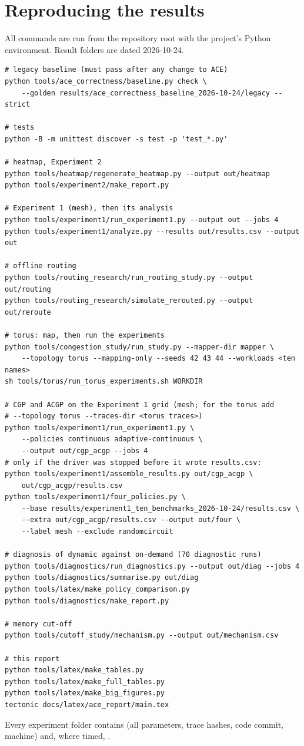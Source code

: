 \chapter{Reproducing the results}
\label{app:repro}

All commands are run from the repository root with the project's Python environment. Result folders are dated 2026-10-24.
{\small
\begin{verbatim}
# legacy baseline (must pass after any change to ACE)
python tools/ace_correctness/baseline.py check \
    --golden results/ace_correctness_baseline_2026-10-24/legacy --strict

# tests
python -B -m unittest discover -s test -p 'test_*.py'

# heatmap, Experiment 2
python tools/heatmap/regenerate_heatmap.py --output out/heatmap
python tools/experiment2/make_report.py

# Experiment 1 (mesh), then its analysis
python tools/experiment1/run_experiment1.py --output out --jobs 4
python tools/experiment1/analyze.py --results out/results.csv --output out

# offline routing
python tools/routing_research/run_routing_study.py --output out/routing
python tools/routing_research/simulate_rerouted.py --output out/reroute

# torus: map, then run the experiments
python tools/congestion_study/run_study.py --mapper-dir mapper \
    --topology torus --mapping-only --seeds 42 43 44 --workloads <ten names>
sh tools/torus/run_torus_experiments.sh WORKDIR

# CGP and ACGP on the Experiment 1 grid (mesh; for the torus add
# --topology torus --traces-dir <torus traces>)
python tools/experiment1/run_experiment1.py \
    --policies continuous adaptive-continuous \
    --output out/cgp_acgp --jobs 4
# only if the driver was stopped before it wrote results.csv:
python tools/experiment1/assemble_results.py out/cgp_acgp \
    out/cgp_acgp/results.csv
python tools/experiment1/four_policies.py \
    --base results/experiment1_ten_benchmarks_2026-10-24/results.csv \
    --extra out/cgp_acgp/results.csv --output out/four \
    --label mesh --exclude randomcircuit

# diagnosis of dynamic against on-demand (70 diagnostic runs)
python tools/diagnostics/run_diagnostics.py --output out/diag --jobs 4
python tools/diagnostics/summarise.py out/diag
python tools/latex/make_policy_comparison.py
python tools/diagnostics/make_report.py

# memory cut-off
python tools/cutoff_study/mechanism.py --output out/mechanism.csv

# this report
python tools/latex/make_tables.py
python tools/latex/make_full_tables.py
python tools/latex/make_big_figures.py
tectonic docs/latex/ace_report/main.tex
\end{verbatim}}
Every experiment folder contains \code{run_parameters.json} (all parameters, trace hashes, code commit, machine) and, where timed, .

